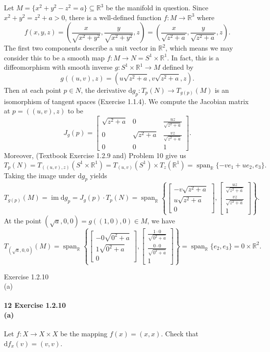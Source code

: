 \documentclass[12pt]{article}
\newlength{\myparskip}
\newenvironment{fullbox}{\begin{lrbox}{\savefullbox}\begin{minipage}{\dimexpr\textwidth-2\fboxsep\relax}\setlength{\parskip}{\myparskip}}{\end{minipage}\end{lrbox}\framebox[\textwidth]{\usebox{\savefullbox}}}
\newenvironment{pbox}[1][]{\begin{fullbox}\ifx#1\empty\else\paragraph{#1}\phantom{}\fi}{\end{fullbox}}
\theoremstyle{definition}
\newcommand{\R}{\mathbb{R}}
\newcommand{\<}{\langle}
\renewcommand{\>}{\rangle}
\newcommand{\seq}{\subseteq}
\DeclareMathOperator{\im}{im}
\newcommand{\dd}{\mathrm{d}}
\newcommand{\mat}[1]{\begin{bmatrix}#1\end{bmatrix}}
\begin{document}
Let $M = \{x^2 + y^2 - z^2 = a\} \seq \R^3$ be the manifold in question.
Since $x^2 + y^2 = z^2 + a > 0$, there is a well-defined function $f : M \to \R^3$ where
\[\textstyle
    f(x, y, z)
        = \left(\frac{x}{\sqrt{x^2 + y^2}}, \frac{y}{\sqrt{x^2 + y^2}}, z\right)
        = \left(\frac{x}{\sqrt{z^2 + a}}, \frac{y}{\sqrt{z^2 + a}}, z\right).
\]
The first two components describe a unit vector in $\R^2$, which means we may consider this to be a smooth map $f : M \to N = S^1 \times \R^1$.
In fact, this is a diffeomorphism with smooth inverse $g : S^1 \times \R^1 \to M$ defined by
\[
    g((u, v), z) = \left(u\sqrt{z^2 + a}, v\sqrt{z^2 + a}, z\right).
\]
Then at each point $p \in N$, the derivative $\dd{g}_p : T_{p}(N) \to T_{g(p)}(M)$ is an isomorphism of tangent spaces (Exercise 1.1.4).
We compute the Jacobian matrix at $p = ((u, v), z)$ to be
\[
    J_g(p) = \mat{
        \sqrt{z^2 + a} & 0 & \frac{uz}{\sqrt{z^2 + a}} \\
        0 & \sqrt{z^2 + a} & \frac{vz}{\sqrt{z^2 + a}} \\
        0 & 0 & 1
    }.
\]
Moreover, (Textbook Exercise 1.2.9 and) Problem 10 give us
\[
    T_p(N)
        = T_{((u, v), z)}(S^1 \times \R^1)
        = T_{(u, v)}(S^1) \times T_z(\R^1)
        = \operatorname{span}_\R\{-ve_1 + ue_2, e_3\}.
\]
Taking the image under $\dd{g}_p$ yields
\[
    T_{g(p)}(M)
        = \im \dd{g}_p
        = J_g(p) \cdot T_p(N)
        = \operatorname{span}_\R\left\{
            \mat{-v\sqrt{z^2 + a} \\ u\sqrt{z^2 + a} \\ 0},
            \mat{\frac{uz}{\sqrt{z^2 + a}} \\ \frac{vz}{\sqrt{z^2 + a}} \\ 1}
        \right\}.
\]
At the point $(\sqrt{a}, 0, 0) = g((1, 0), 0) \in M$, we have
\[
    T_{(\sqrt{a}, 0, 0)}(M) = \operatorname{span}_\R\left\{
        \mat{-0\sqrt{0^2 + a} \\ 1\sqrt{0^2 + a} \\ 0},
        \mat{\frac{1 \cdot 0}{\sqrt{0^2 + a}} \\ \frac{0 \cdot 0}{\sqrt{0^2 + a}} \\ 1}
    \right\} = \operatorname{span}_\R\{e_2, e_3\} = 0 \times \R^2.
\]


\begin{pbox}[12 Exercise 1.2.10 \\ (a)]
    Let $f : X \to X \times X$ be the mapping $f(x) = (x, x)$.
    Check that $\dd{f}_x(v) = (v, v)$.
\end{pbox}
\end{document}
